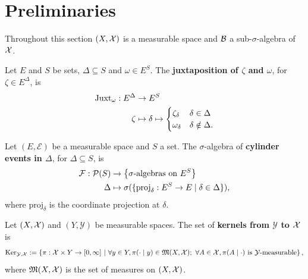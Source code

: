 \section{Preliminaries}

Throughout this section $(X,\mathcal{X})$ is a measurable space and $\mathcal{B}$ a sub-$\sigma$-algebra of
$\mathcal{X}$.

\begin{definition}[Juxtaposition]
    \label{def:juxtaposition}
    \leanok{}

    Let $E$ and $S$ be sets, $\Delta \subseteq S$ and $\omega\in E^S$. The
    \textbf{juxtaposition of $\zeta$ and $\omega$}, for $\zeta\in E^\Delta$, is
    \begin{align}
        \operatorname{Juxt}_{\omega} : E^\Delta&\to E^S\\
        \zeta&\mapsto \delta\mapsto\begin{cases}
            \zeta_\delta & \delta\in\Delta\\
            \omega_\delta & \delta\notin\Delta.
        \end{cases}
    \end{align}
\end{definition}

\begin{definition}
    \label{def:cylinder-event}
    \leanok{}

    Let $(E,\mathcal{E})$ be a measurable space and $S$ a set. The $\sigma$-algebra of
    \textbf{cylinder events in $\Delta$}, for $\Delta \subseteq S$, is
    \begin{align}
        \mathcal{F}:\mathcal{P}(S)&\to \left\{ \sigma\text{-algebras on } E^S \right\}\\
        \Delta&\mapsto \sigma(\{\text{proj}_\delta:E^S\to E\mid \delta\in \Delta\}),
    \end{align}
    where $\text{proj}_\delta$ is the coordinate projection at $\delta$.
\end{definition}

\begin{definition}[Kernel]
    \label{def:kernel}
    \leanok{}

    Let $(X,\mathcal{X})$ and $(Y,\mathcal{Y})$ be measurable spaces. The set of \textbf{kernels from
    $\mathcal{Y}$ to $\mathcal{X}$} is
    \[\text{Ker}_{\mathcal{Y},\mathcal{X}}:=\left\{\pi:\mathcal{X}\times Y\to[0,\infty]~\middle\vert~ \forall y\in Y,\pi(\cdot\mid y)\in\mathfrak{M}(X,\mathcal{X});~\forall A\in\mathcal{X},\pi(A\mid\cdot)\text{ is }\mathcal{Y}\text{-measurable}\right\},\]
    where $\mathfrak{M}(X,\mathcal{X})$ is the set of measures on $(X,\mathcal{X})$.
\end{definition}

